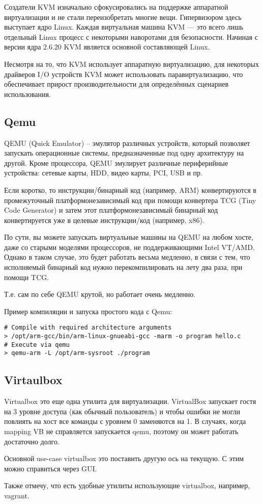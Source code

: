 Создатели KVM изначально сфокусировались на поддержке аппаратной виртуализации и не стали переизобретать многие вещи.
Гипервизором здесь выступает ядро Linux.
Каждая виртуальная машина KVM --- это всего лишь отдельный Linux процесс с некоторыми наворотами для безопасности.
Начиная с версии ядра 2.6.20 KVM является основной составляющей Linux.

Несмотря на то, что KVM использует аппаратную виртуализацию, для некоторых драйверов I/O устройств KVM может использовать паравиртуализацию, что обеспечивает прирост производительности для определённых сценариев использования.

\subsection{Qemu}
QEMU (Quick Emulator) – эмулятор различных устройств, который позволяет запускать операционные системы, предназначенные под одну архитектуру на другой.
Кроме процессора, QEMU эмулирует различные периферийные устройства: сетевые карты, HDD, видео карты, PCI, USB и пр.

Если коротко, то инструкции/бинарный код (например, ARM) конвертируются в промежуточный платформонезависимый код при помощи конвертера TCG (Tiny Code Generator) и затем этот платформонезависимый бинарный код конвертируется уже в целевые инструкции/код (например, x86).

По сути, вы можете запускать виртуальные машины на QEMU на любом хосте, даже со старыми моделями процессоров, не поддерживающими Intel VT/AMD.
Однако в таком случае, это будет работать весьма медленно, в связи с тем, что исполняемый бинарный код нужно перекомпилировать на лету два раза, при помощи TCG.

Т.е. сам по себе QEMU крутой, но работает очень медленно.

Пример компиляции и запуска простого кода с Qemu:
\begin{lstlisting}
# Compile with required architecture arguments
> /opt/arm-gcc/bin/arm-linux-gnueabi-gcc -marm -o program hello.c
# Execute via qemu
> qemu-arm -L /opt/arm-sysroot ./program
\end{lstlisting}

\subsection{Virtaulbox}
Virtualbox это еще одна утилита для виртуализации.
VirtualBox запускает гостя на 3 уровне доступа (как обычный пользователь) и чтобы ошибки не могли повлиять на хост все команды с уровнем 0 заменяются на 1.
В случаях, когда mapping VB не справляется запускается qemu, поэтому он может работать достаточно долго.

Основной use-case virtualbox это поставить другую ось на текущую.
С этим можно справиться через GUI.

Также отмечу, что есть удобные утилиты использующие virtualbox, например, vagrant.

